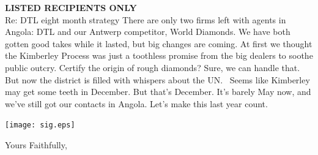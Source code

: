 \documentclass[12pt]{letter}
\begin{document}
\begin{letter}{{\bf LISTED RECIPIENTS ONLY}\\ \vspace{0.25in} Re: DTL eight month strategy}
There are only two firms left with agents in Angola:  DTL and our Antwerp competitor, World Diamonds.  We have both gotten good takes while it lasted, but big changes are coming.  At first we thought the Kimberley Process was just a toothless promise from the big dealers to soothe public outcry.  Certify the origin of rough diamonds?  Sure, we can handle that.  But now the district is filled with whispers about the UN. \ Seems like Kimberley may get some teeth in December.  But that's December.  It's barely May now, and we've still got our contacts in Angola.  Let's make this last year count.



\vspace*{0.35in}
\begin{center}
\texttt{[image: sig.eps]}
\end{center}
\vspace*{-1.25in}


\closing{Yours Faithfully,}





\end{letter}
\end{document}
